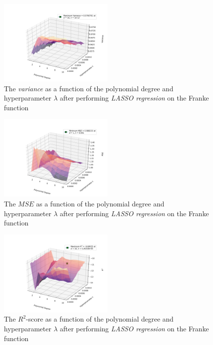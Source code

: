 \documentclass[a4paper,10pt,english]{article}
\begin{document}

\begin{figure}[H]
	\centering 
	\includegraphics[width = 0.5\textwidth, center]{../franke_output/part_E_1.png}
	\caption{The \textit{variance} as a function of the polynomial degree and hyperparameter $\lambda$ after performing \textit{LASSO regression} on the Franke function}
	\label{part_e1}
\end{figure}

\begin{figure}[H]
	\centering 
	\includegraphics[width = 0.5\textwidth, center]{../franke_output/part_E_2.png}
	\caption{The $MSE$ as a function of the polynomial degree and hyperparameter $\lambda$ after performing \textit{LASSO regression} on the Franke function}
	\label{part_e2}
\end{figure}

\begin{figure}[H]
	\centering 
	\includegraphics[width = 0.5\textwidth, center]{../franke_output/part_E_3.png}
	\caption{The $R^2$-score as a function of the polynomial degree and hyperparameter $\lambda$ after performing \textit{LASSO regression} on the Franke function}
	\label{part_e3}
\end{figure}
\end{document}
